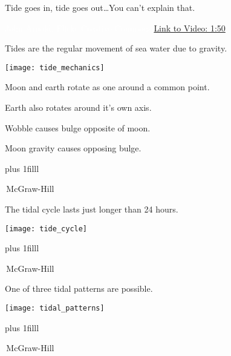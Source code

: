 \documentclass[t]{beamer}
\begin{document}

{
\begin{frame}[b]{Tide goes in, tide goes out\dots You can't explain that.}

\tiny\textcolor{white}{John Arnold, Flickr Creative Commons.\hfill\href{https://www.youtube.com/watch?v=wb3AFMe2OQY&t=110s}{Link to Video: 1:50}}
\end{frame}
}

\begin{frame}[t]{Tides are the regular movement of sea water due to gravity.}

\vspace*{-\baselineskip}

\begin{multicols}{2}

	\begin{center}
		\texttt{[image: tide\_mechanics]}
	\end{center}

\columnbreak

	\hangpara Moon and earth rotate as one around a common point.

	\hangpara Earth also rotates around it’s own axis.

	\hangpara Wobble causes bulge opposite of moon.

	\hangpara Moon gravity causes opposing bulge.
\end{multicols}

	\vskip0pt plus 1filll

	\tiny\textcopyright\,McGraw-Hill

\end{frame}


\begin{frame}[t]{The tidal cycle lasts just longer than 24 hours.}
	\vspace*{-\baselineskip}

	\begin{center}
		\texttt{[image: tide\_cycle]} 
	\end{center}

	\vskip0pt plus 1filll

	\tiny\textcopyright\,McGraw-Hill

\end{frame}

\begin{frame}[t]{One of three tidal patterns are possible.}

	\vspace*{-\baselineskip}

	\begin{center}
		\texttt{[image: tidal\_patterns]} 
	\end{center}

	\vskip0pt plus 1filll

	\tiny\textcopyright\,McGraw-Hill

\end{frame}
\end{document}
